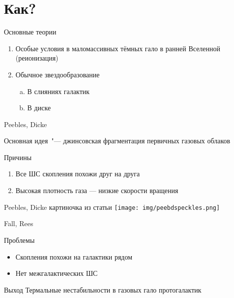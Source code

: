 \documentclass{beamer}
\begin{document}
\section{Как?}

\begin{frame}[wide]{Основные теории}
    \begin{enumerate}
        \item Особые условия в маломассивных тёмных гало в ранней Вселенной (реионизация)
        \item Обычное звездообразование\par
        \begin{enumerate}[a)]
            \item В слияниях галактик
            \item В диске
        \end{enumerate}
    \end{enumerate}
\end{frame}


\begin{frame}{Peebles, Dicke}

Основная идея~"--- джинсовская фрагментация первичных газовых облаков

\begin{block}{Причины}
    \begin{enumerate}
        \item Все ШС скопления похожи друг на друга
        \item Высокая плотность газа --- низкие скорости вращения
    \end{enumerate}
\end{block}
\end{frame}

\begin{frame}{Peebles, Dicke}
картиночка из статьи \cite{peebdicke}
    \texttt{[image: img/peebdspeckles.png]}
\end{frame}

\begin{frame}{Fall, Rees}

\begin{block}{Проблемы}
    \begin{itemize}
        \item Скопления похожи на галактики рядом
        \item Нет межгалактических ШС
    \end{itemize}
\end{block}

\begin{block}{Выход}
Термальные нестабильности в газовых гало протогалактик
\end{block}

\end{frame}
\end{document}
